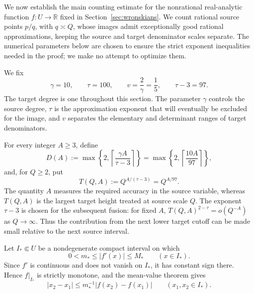 \documentclass[11pt]{amsart}
\numberwithin{equation}{section}
\theoremstyle{definition}
\theoremstyle{remark}
\newcommand{\R}{\mathbb R}
\newcommand{\abs}[1]{\left\lvert #1\right\rvert}
\newcommand{\set}[1]{\left\{#1\right\}}
\begin{document}
We now establish the main counting estimate for the nonrational
real-analytic function $f:U\to\R$ fixed in
Section~\ref{sec:wronskians}. We count rational source points
$p/q$, with $q\asymp Q$, whose images admit exceptionally good
rational approximations, keeping the source and target denominator
scales separate. The numerical parameters below are chosen to
ensure the strict exponent inequalities needed in the proof;
we make no attempt to optimize them.

We fix
\begin{equation}\label{eq:fixed-parameters-en}
\gamma=10,
\qquad
\tau=100,
\qquad
v=\frac{2}{\gamma}=\frac15,
\qquad
\tau-3=97.
\end{equation}
The target degree is one throughout this section. The parameter
$\gamma$ controls the source degree, $\tau$ is the approximation
exponent that will eventually be excluded for the image, and $v$
separates the elementary and determinant ranges of target
denominators.

For every integer $A\geq3$, define
\begin{equation}\label{eq:D-A-en}
D(A)
:=
\max\set{2,\left\lceil\frac{\gamma A}{\tau-3}\right\rceil}
=
\max\set{2,\left\lceil\frac{10A}{97}\right\rceil},
\end{equation}
and, for $Q\geq2$, put
\begin{equation}\label{eq:T-Q-A-en}
T(Q,A):=Q^{A/(\tau-3)}=Q^{A/97}.
\end{equation}
The quantity $A$ measures the required accuracy in the source
variable, whereas $T(Q,A)$ is the largest target height treated at
source scale $Q$. The exponent $\tau-3$ is chosen for the subsequent fusion: for fixed $A$,
$T(Q,A)^{2-\tau}=o(Q^{-A})$ as $Q\to\infty$.
Thus the contribution from the next lower target cutoff can
be made small relative to the next source interval.

Let $I_*\Subset U$ be a nondegenerate compact interval on which
\begin{equation}\label{eq:derivative-bounds-en}
0<m_*\leq\abs{f'(x)}\leq M_*
\qquad(x\in I_*).
\end{equation}
Since $f'$ is continuous and does not vanish on $I_*$, it has constant
sign there. Hence $f|_{I_*}$ is strictly monotone, and the mean-value
theorem gives
\begin{equation}\label{eq:inverse-lipschitz-en}
\abs{x_2-x_1}
\leq
m_*^{-1}\abs{f(x_2)-f(x_1)}
\qquad(x_1,x_2\in I_*).
\end{equation}
\end{document}
